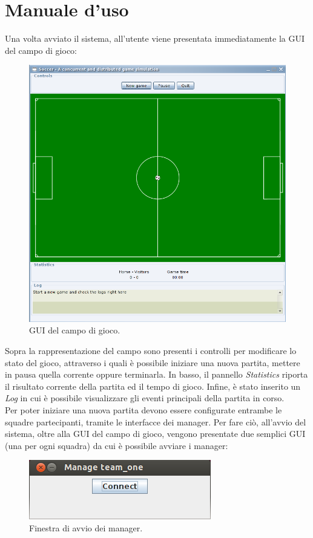 \appendix
\section{Manuale d'uso}
Una volta avviato il sistema, all'utente viene presentata immediatamente la GUI del campo di gioco:
\begin{figure}[h]
	\centering
	\includegraphics[scale=.5,width=\textwidth]{images/field_start}
	\caption{GUI del campo di gioco.}
\end{figure}

Sopra la rappresentazione del campo sono presenti i controlli per modificare lo stato del gioco, attraverso i quali è possibile iniziare una nuova partita, mettere in pausa quella corrente oppure terminarla. In basso, il pannello \emph{Statistics} riporta il risultato corrente della partita ed il tempo di gioco. Infine, è stato inserito un \emph{Log} in cui è possibile visualizzare gli eventi principali della partita in corso.\\

Per poter iniziare una nuova partita devono essere configurate entrambe le squadre partecipanti, tramite le interfacce dei manager. Per fare ciò, all'avvio del sistema, oltre alla GUI del campo di gioco, vengono presentate due semplici GUI (una per ogni squadra) da cui è possibile avviare i manager:
\begin{figure}[h]
	\centering
	\includegraphics[scale=.5]{images/manager_connect}
	\caption{Finestra di avvio dei manager.}
\end{figure}

